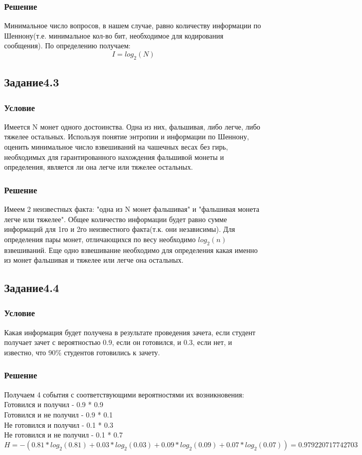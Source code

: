 \documentclass[10pt,a4paper]{article}
\begin{document}
\subsubsection*{Решение}
Минимальное число вопросов, в нашем случае, равно количеству
информации по Шеннону(т.е. минимальное кол-во бит, необходимое для
кодирования сообщения). По определению получаем:
$$ I = log_2(N) $$

\subsection*{Задание4.3}
\subsubsection*{Условие}
Имеется N монет одного достоинства. Одна из них, фальшивая, либо
легче, либо тяжелее остальных. Используя понятие энтропии и информации
по Шеннону, оценить минимальное число взвешиваний на чашечных весах
без гирь, необходимых для гарантированного нахождения фальшивой монеты
и определения, является ли она легче или тяжелее остальных.
\subsubsection*{Решение}
Имеем 2 неизвестных факта:
"одна из N монет фальшивая" и "фальшивая монета легче или
тяжелее". Общее количество информации будет равно сумме
информаций для 1го и 2го неизвестного факта(т.к. они независимы).
Для определения пары монет, отличающихся по весу необходимо $ log_2(n) $
взвешиваний. Еще одно взвешивание необходимо для определения какая
именно из монет фальшивая и тяжелее или легче она остальных.

\subsection*{Задание4.4}
\subsubsection*{Условие}
Какая информация будет получена в результате проведения зачета, если
студент получает зачет с вероятностью 0.9, если он готовился, и 0.3,
если нет, и известно, что 90\% студентов готовились к зачету.
\subsubsection*{Решение}
Получаем 4 события с соответствующими вероятностями их
возникновения:\\
Готовился и получил - 0.9 * 0.9 \\
Готовился и не получил - 0.9 * 0.1 \\
Не готовился и получил - 0.1 * 0.3 \\
Не готовился и не получил - 0.1 * 0.7 \\

$$ H = -( 0.81*log_2(0.81) + 0.03*log_2(0.03) + 0.09*log_2(0.09) +
0.07*log_2(0.07) ) = 0.979220717742703 $$
\end{document}
